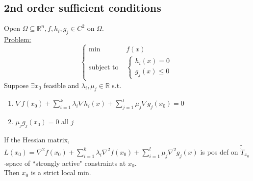 \documentclass[11pt]{article}
\newcommand{\real}[0]{\mathbb{R}}
\newcommand{\under}[1]{\underline{#1}}
\begin{document}
\subsection{2nd order sufficient conditions}
Open $\Omega \subseteq \real^n, f, h_i, g_j \in C^2$ on $\Omega$. \\
\under{Problem:}
$$\begin{cases}
	\min &f(x) \\
	\text{subject to }&\begin{cases}h_i(x) = 0 \\
	g_j(x) \leq 0 \end{cases}
\end{cases}$$
Suppose $\exists x_0$ feasible and $\lambda_i, \mu_j \in \real$ s.t. 
\begin{enumerate}
	\item $\nabla f(x_0) + \sum_{i=1}^k \lambda_i \nabla h_i(x) + \sum_{j=1}^l \mu_j \nabla g_j(x_0) = 0$
	\item $\mu_j g_j(x_0) =0$ all $j$
\end{enumerate}
If the Hessian matrix, $L(x_0) = \nabla^2 f(x_0) + \sum_{i=1}^k \lambda_i \nabla^2 f(x_0) + \sum_{i=1}^l \mu_j \nabla^2 g_j(x)$ is pos def on $\tilde{\tilde{T}}_{x_0}$-space of ``strongly active" constraints at $x_0$. \\
Then $x_0$ is a strict local min. \\
\end{document}
